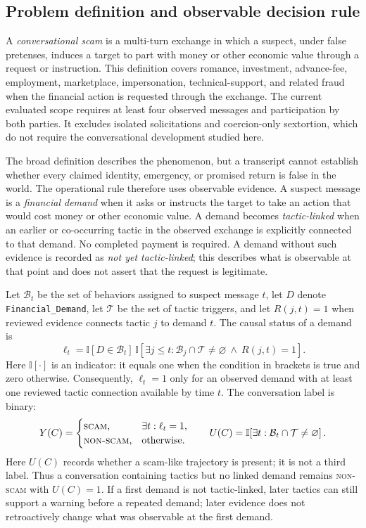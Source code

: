 \documentclass[letterpaper,11pt]{article}
\begin{document}
\subsection{Problem definition and observable decision rule}
A \emph{conversational scam} is a multi-turn exchange in which a suspect, under
false pretenses, induces a target to part with money or other economic value
through a request or instruction. This definition covers romance, investment,
advance-fee, employment, marketplace, impersonation, technical-support, and
related fraud when the financial action is requested through the exchange. The
current evaluated scope requires at least four observed messages and participation
by both parties. It excludes isolated solicitations and coercion-only sextortion,
which do not require the conversational development studied here.

The broad definition describes the phenomenon, but a transcript cannot establish
whether every claimed identity, emergency, or promised return is false in the
world. The operational rule therefore uses observable evidence. A suspect message
is a \emph{financial demand} when it asks or instructs the target to take an action
that would cost money or other economic value. A demand becomes \emph{tactic-linked}
when an earlier or co-occurring tactic in the observed exchange is explicitly
connected to that demand. No completed payment is required. A demand without such
evidence is recorded as \emph{not yet tactic-linked}; this describes what is
observable at that point and does not assert that the request is legitimate.

Let $\mathcal B_t$ be the set of behaviors assigned to suspect message $t$, let
$D$ denote \texttt{Financial\_Demand}, let $\mathcal T$ be the set of tactic
triggers, and let $R(j,t)=1$ when reviewed evidence connects tactic $j$ to demand
$t$. The causal status of a demand is
\begin{equation}
 \ell_t = \mathbb{I}[D\in\mathcal B_t]\,
 \mathbb{I}\!\left[\exists j\leq t:
   \mathcal B_j\cap\mathcal T\neq\varnothing\ \land\ R(j,t)=1\right].
 \label{eq:demand-link}
\end{equation}
Here $\mathbb{I}[\cdot]$ is an indicator: it equals one when the condition in
brackets is true and zero otherwise. Consequently, $\ell_t=1$ only for an
observed demand with at least one reviewed tactic connection available by time
$t$.
The conversation label is binary:
\begin{equation}
 Y(C)=
 \begin{cases}
  \textsc{scam}, & \exists t:\ell_t=1,\\
  \textsc{non-scam}, & \text{otherwise}.
 \end{cases}
 \qquad
 U(C)=\mathbb{I}\!\left[\exists t:
 \mathcal B_t\cap\mathcal T\neq\varnothing\right].
 \label{eq:binary-label}
\end{equation}
Here $U(C)$ records whether a scam-like trajectory is present; it is not a third
label. Thus a conversation containing tactics but no linked demand remains
\textsc{non-scam} with $U(C)=1$. If a first demand is not tactic-linked, later
tactics can still support a warning before a repeated demand; later evidence does
not retroactively change what was observable at the first demand.
\end{document}
